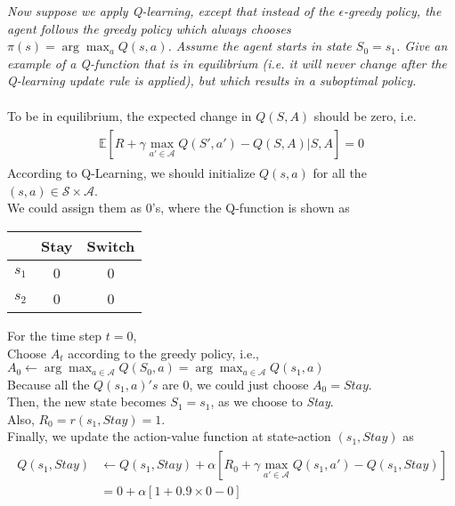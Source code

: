 \documentclass{myhw}
\begin{document}
\begin{homeworkProblem}
\begin{homeworkSection}
\end{homeworkSection}
\begin{homeworkSection}	
\emph{Now suppose we apply Q-learning, except that instead of the $\epsilon$-greedy policy, the agent follows the greedy policy which always chooses $\pi(s) = \arg \max_a Q(s,a)$. Assume the agent starts in state $S_0 = s_1$. Give an example of a Q-function that is in equilibrium (i.e. it will never change after the Q-learning update rule is applied), but which results in a suboptimal policy.} \\
\\
To be in equilibrium, the expected change in $Q(S, A)$ should be zero, i.e.
\begin{gather*}
\begin{aligned}
\mathbb{E} [R + \gamma \max_{a'\in\mathcal{A}} Q(S',a') - Q(S,A)|S,A] = 0
\end{aligned}
\end{gather*}
According to Q-Learning, we should initialize $Q(s,a)$ for all the $(s,a) \in \mathcal{S} \times \mathcal{A}$. \\
We could assign them as 0's, where the Q-function is shown as 
\begin{center}
\begin{tabular}{c|c|c}
  & Stay & Switch \\ 
 \hline
 $s_1$ & 0 & 0 \\  
 \hline
 $s_2$ & 0 & 0    
\end{tabular} 
\end{center} 
For the time step $t=0$, \\
Choose $A_t$ according to the greedy policy, i.e., 
$A_0 \leftarrow \arg\max_{a\in\mathcal{A}}Q(S_0, a)=\arg\max_{a\in\mathcal{A}}Q(s_1, a)$ \\
Because all the $Q(s_1,a)'s$ are 0, we could just choose $A_0 = Stay$. \\
Then, the new state becomes $S_1=s_1$, as we choose to \emph{Stay}. \\
Also, $R_0 = r(s_1,Stay)=1$. \\
Finally, we update the action-value function at state-action $(s_1,Stay)$ as 
\begin{gather*}
\begin{aligned}
Q(s_1,Stay) &\leftarrow Q(s_1,Stay) + \alpha [R_0 + \gamma \max_{a'\in\mathcal{A}}Q(s_1,a')-Q(s_1,Stay)] \\
&= 0 + \alpha [1 + 0.9 \times 0 - 0] \\

\end{aligned}
\end{gather*}
\end{homeworkSection}
\end{homeworkProblem}
\end{document}
